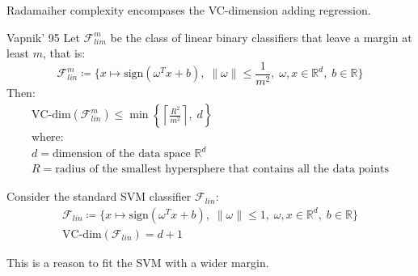 \begin{note}
	Radamaiher complexity encompases the VC-dimension adding
	regression.
\end{note}


\begin{theorem}{Vapnik' 95}{}
	Let $\mathcal{F}_{lim}^m$ be the class of linear binary classifiers that leave
	a margin at least $m$, that is:
	\begin{equation*}
		\mathcal{F}_{lin}^m \coloneqq \{ x \mapsto \text{sign}( \omega^T x + b), \;
		\lVert \omega \rVert \leq \frac{1}{m^2}, \;
		\omega, x \in \mathds{R}^d,\;
		b \in \mathds{R} \}
	\end{equation*}
	Then:
	\begin{align*}
		\text{VC-dim}(\mathcal{F}_{lin}^m)  \leq \min \left\{
		\left\lceil \frac{R^2}{m^2} \right\rceil, \;
		d
		\right\}                                                                               \\
		\text{where:}                                                                          \\
		d                                   = \text{dimension of the data space } \mathds{R}^d \\
		R                                   = \text{radius of the smallest hypersphere that contains all the data points}
	\end{align*}
\end{theorem}

Consider the standard SVM classifier $\mathcal{F}_{lin}$:
\begin{align*}
	\mathcal{F}_{lin} \coloneqq \{ x \mapsto \text{sign}( \omega^T x + b), \;
	\lVert \omega \rVert \leq 1, \;
	\omega, x \in \mathds{R}^d,\;
	b \in \mathds{R} \} \\
	\text{VC-dim}(\mathcal{F}_{lin}) = d + 1
\end{align*}

This is a reason to fit the SVM with a wider margin.

